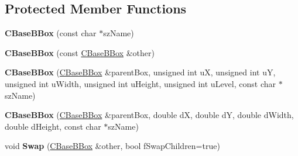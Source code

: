 \subsection*{Protected Member Functions}
\begin{DoxyCompactItemize}
\item 
\mbox{\label{class_c_base_b_box_a98aeefbd3d2a5d3fddbff2a15a1f926d}} 
{\bfseries C\+Base\+B\+Box} (const char $\ast$sz\+Name)
\item 
\mbox{\label{class_c_base_b_box_a7f317d3b2721d89328cedb18afbd910e}} 
{\bfseries C\+Base\+B\+Box} (const \hyperlink{class_c_base_b_box}{C\+Base\+B\+Box} \&other)
\item 
\mbox{\label{class_c_base_b_box_a8c82f37c693b3c771e1fe3c43b932059}} 
{\bfseries C\+Base\+B\+Box} (\hyperlink{class_c_base_b_box}{C\+Base\+B\+Box} \&parent\+Box, unsigned int uX, unsigned int uY, unsigned int u\+Width, unsigned int u\+Height, unsigned int u\+Level, const char $\ast$sz\+Name)
\item 
\mbox{\label{class_c_base_b_box_abdee10baefbacc0376572f31f1c8416c}} 
{\bfseries C\+Base\+B\+Box} (\hyperlink{class_c_base_b_box}{C\+Base\+B\+Box} \&parent\+Box, double dX, double dY, double d\+Width, double d\+Height, const char $\ast$sz\+Name)
\item 
\mbox{\label{class_c_base_b_box_ac98ee8da50886c5b8e74fcbe1130abc4}} 
void {\bfseries Swap} (\hyperlink{class_c_base_b_box}{C\+Base\+B\+Box} \&other, bool f\+Swap\+Children=true)
\end{DoxyCompactItemize}
